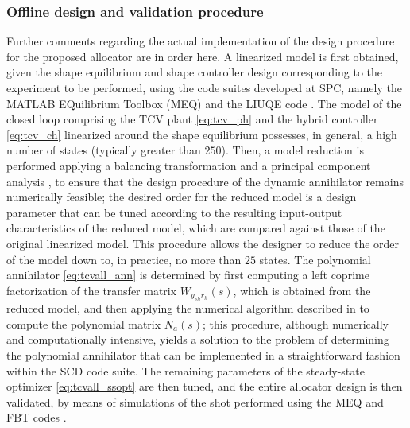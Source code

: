 \subsubsection{Offline design and validation procedure}
\label{sec:tcvall_val}
Further comments regarding the actual implementation of the design procedure for the proposed allocator are in order here. A linearized model is first obtained, given the shape equilibrium and shape controller design corresponding to the experiment to be performed, using the code suites developed at SPC, namely the MATLAB EQuilibrium Toolbox (MEQ) \cite{parys_modeling_2024} and the LIUQE code \cite{moret_tokamak_2015}. The model of the closed loop comprising the TCV plant \eqref{eq:tcv_ph} and the hybrid controller \eqref{eq:tcv_ch} linearized around the shape equilibrium possesses, in general, a high number of states (typically greater than $250$). Then, a model reduction is performed applying a balancing transformation \cite{laub_computation_1987} and a principal component analysis \cite{moore_principal_1981}, to ensure that the design procedure of the dynamic annihilator remains numerically feasible; the desired order for the reduced model is a design parameter that can be tuned according to the resulting input-output characteristics of the reduced model, which are compared against those of the original linearized model. This procedure allows the designer to reduce the order of the model down to, in practice, no more than $25$ states. The polynomial annihilator \eqref{eq:tcvall_ann} is determined by first computing a left coprime factorization of the transfer matrix $W_{y_{sh}{r_h}}(s)$, which is obtained from the reduced model, and then applying the numerical algorithm described in \cite{tenaglia_robust_2023} to compute the polynomial matrix $N_a(s)$; this procedure, although numerically and computationally intensive, yields a solution to the problem of determining the polynomial annihilator that can be implemented in a straightforward fashion within the SCD code suite. The remaining parameters of the steady-state optimizer \eqref{eq:tcvall_ssopt} are then tuned, and the entire allocator design is then validated, by means of simulations of the shot performed using the MEQ and FBT codes \cite{hofmann_fbt_1988,merle_full_2024,marchioni_vertical_2023,coosemans_application_2024}.
